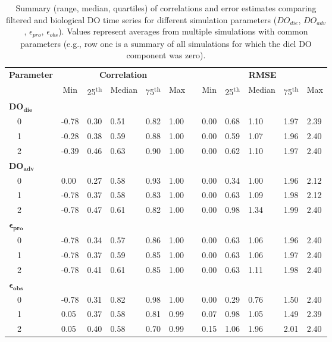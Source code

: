 \documentclass[letterpaper,12pt,oneside]{article}\usepackage[]{graphicx}\usepackage[]{color}
\begin{document}
\begin{table}[h]
\caption{Summary (range, median, quartiles) of correlations and error estimates comparing filtered and biological \ac{DO} time series for different simulation parameters ($DO_{die}$, $DO_{adv}$, $\epsilon_{pro}$, $\epsilon_{obs}$).  Values represent averages from multiple simulations with common parameters (e.g., row one is a summary of all simulations for which the diel \ac{DO} component was zero).\label{tab:dtd_perf1}} 
\begin{center}
\begin{tabular}{llllllclllll}
\hline\hline
\multicolumn{1}{l}{\bfseries Parameter}&\multicolumn{5}{c}{\bfseries Correlation}&\multicolumn{1}{c}{\bfseries }&\multicolumn{5}{c}{\bfseries RMSE}\tabularnewline
\cline{2-6} \cline{8-12}
\multicolumn{1}{l}{}&\multicolumn{1}{c}{Min}&\multicolumn{1}{c}{25\textsuperscript{th}}&\multicolumn{1}{c}{Median}&\multicolumn{1}{c}{75\textsuperscript{th}}&\multicolumn{1}{c}{Max}&\multicolumn{1}{c}{}&\multicolumn{1}{c}{Min}&\multicolumn{1}{c}{25\textsuperscript{th}}&\multicolumn{1}{c}{Median}&\multicolumn{1}{c}{75\textsuperscript{th}}&\multicolumn{1}{c}{Max}\tabularnewline
\hline
{\bfseries $\boldsymbol{DO_{die}}$}&&&&&&&&&&&\tabularnewline
~~0&-0.78&0.30&0.51&0.82&1.00&&0.00&0.68&1.10&1.97&2.39\tabularnewline
~~1&-0.28&0.38&0.59&0.88&1.00&&0.00&0.59&1.07&1.96&2.40\tabularnewline
~~2&-0.39&0.46&0.63&0.90&1.00&&0.00&0.62&1.10&1.97&2.40\tabularnewline
\hline
{\bfseries $\boldsymbol{DO_{adv}}$}&&&&&&&&&&&\tabularnewline
~~0& 0.00&0.27&0.58&0.93&1.00&&0.00&0.34&1.00&1.96&2.12\tabularnewline
~~1&-0.78&0.37&0.58&0.83&1.00&&0.00&0.63&1.09&1.98&2.12\tabularnewline
~~2&-0.78&0.47&0.61&0.82&1.00&&0.00&0.98&1.34&1.99&2.40\tabularnewline
\hline
{\bfseries $\boldsymbol{\epsilon_{pro}}$}&&&&&&&&&&&\tabularnewline
~~0&-0.78&0.34&0.57&0.86&1.00&&0.00&0.63&1.06&1.96&2.40\tabularnewline
~~1&-0.78&0.37&0.59&0.85&1.00&&0.00&0.63&1.06&1.97&2.40\tabularnewline
~~2&-0.78&0.41&0.61&0.85&1.00&&0.00&0.63&1.11&1.98&2.40\tabularnewline
\hline
{\bfseries $\boldsymbol{\epsilon_{obs}}$}&&&&&&&&&&&\tabularnewline
~~0&-0.78&0.31&0.82&0.98&1.00&&0.00&0.29&0.76&1.50&2.40\tabularnewline
~~1& 0.05&0.37&0.58&0.81&0.99&&0.07&0.98&1.05&1.49&2.39\tabularnewline
~~2& 0.05&0.40&0.58&0.70&0.99&&0.15&1.06&1.96&2.01&2.40\tabularnewline
\hline
\end{tabular}\end{center}

\end{table}
\end{document}
